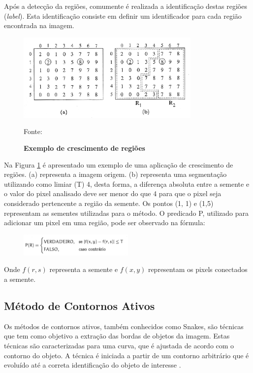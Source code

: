\documentclass[
	12pt,				%
	oneside,			%
	a4paper,			%
	english,			%
	french,				%
	spanish,			%
	brazil,				%
	]{abntex2}
\begin{document}
Após a detecção da regiões, comumente é realizada a identificação destas regiões (\textit{label}). Esta identificação consiste em definir um identificador para cada região encontrada na imagem. 

\begin{figure}[ht]
\centering
\caption{\textbf{Exemplo de crescimento de regiões}}
\includegraphics[width=0.8\textwidth]{imagens/crescimento_regiao.png}

Fonte: \citet{pedriniSchwartz:2008}
\label{fig:crescimento_regiao}
\end{figure}

Na Figura \ref{fig:crescimento_regiao} é apresentado um exemplo de uma aplicação de crescimento de regiões. (a) representa a imagem origem. (b) representa uma segmentação utilizando como limiar (T) 4, desta forma, a diferença absoluta entre a semente e o valor do pixel analisado deve ser menor do que 4 para que o pixel seja considerado pertencente a região da semente. Os pontos (1, 1) e (1,5) representam as sementes utilizadas para o método. O predicado P, utilizado para adicionar um pixel em uma região, pode ser observado na fórmula:

\begin{figure}[ht]
\centering
\includegraphics[width=0.5\textwidth]{imagens/crescimentoregiao_formula.png}
\end{figure}

Onde \(f(r,s)\) representa a semente e \(f(x, y)\) representam os pixels conectados a semente.
    
\subsection{Método de Contornos Ativos}     

Os métodos de contornos ativos, também conhecidos como Snakes, são técnicas que tem como objetivo a extração das bordas de objetos da imagem. Estas técnicas são caracterizadas para uma curva, que é ajustada de acordo com o contorno do objeto. A técnica é iniciada a partir de um contorno arbitrário que é evoluído até a correta identificação do objeto de interesse \cite{conciAzevedoLeta:2008}.
\end{document}
